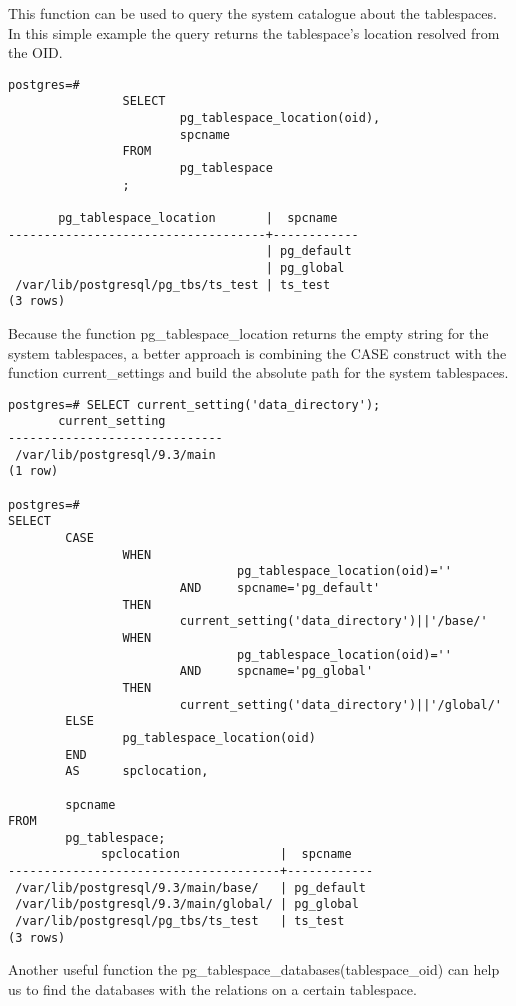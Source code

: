 This function can be used to query the system catalogue about the tablespaces. In this simple example the 
query returns the tablespace's location resolved from the OID. 

\begin{lstlisting}[style=pgsql]
postgres=# 
                SELECT 
                        pg_tablespace_location(oid),
                        spcname 
                FROM 
                        pg_tablespace
                ;
        
       pg_tablespace_location       |  spcname   
------------------------------------+------------
                                    | pg_default
                                    | pg_global
 /var/lib/postgresql/pg_tbs/ts_test | ts_test
(3 rows)

\end{lstlisting}

Because the function pg\_tablespace\_location returns the empty string for the system tablespaces, a better 
approach is combining the CASE construct with the function current\_settings and build the absolute path 
for the system tablespaces.

\begin{lstlisting}[style=pgsql]
 postgres=# SELECT current_setting('data_directory');
       current_setting        
------------------------------
 /var/lib/postgresql/9.3/main
(1 row)

postgres=# 
SELECT 
        CASE
                WHEN 
                                pg_tablespace_location(oid)=''
                        AND     spcname='pg_default'
                THEN
                        current_setting('data_directory')||'/base/'
                WHEN 
                                pg_tablespace_location(oid)=''
                        AND     spcname='pg_global'
                THEN
                        current_setting('data_directory')||'/global/'
        ELSE
                pg_tablespace_location(oid)
        END
        AS      spclocation,
                
        spcname 
FROM 
        pg_tablespace;
             spclocation              |  spcname   
--------------------------------------+------------
 /var/lib/postgresql/9.3/main/base/   | pg_default
 /var/lib/postgresql/9.3/main/global/ | pg_global
 /var/lib/postgresql/pg_tbs/ts_test   | ts_test
(3 rows)

\end{lstlisting}

Another useful function the pg\_tablespace\_databases(tablespace\_oid) can help us to find the databases 
with the relations on a certain tablespace.\newline

